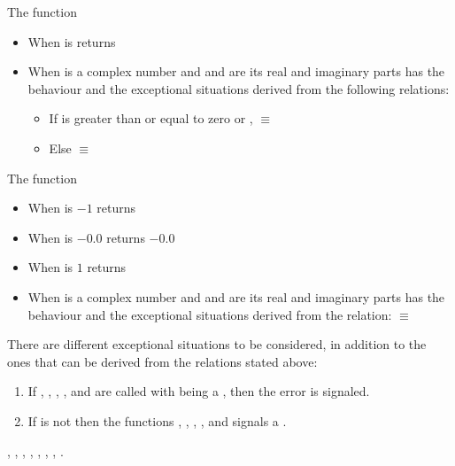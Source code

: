 \documentclass[../Exponentials-Logarithms-Trigonometry.tex]{subfiles}
\begin{document}
\noindent
The function 
\begin{itemize}
  \item When  is  returns
  \item When  is a complex number and   and 
  are its real and imaginary parts has the behaviour and the exceptional
  situations derived from the following relations:
  \begin{itemize}
    \item If  is greater than or equal to zero or
    , \code{)}
    $\equiv$ \code{
    }\code{)))}
    \item Else  \code{)}
    $\equiv$ \code{
    }\code{))))}
  \end{itemize}
\end{itemize}

\noindent
The function 
\begin{itemize}
  \item When  is $-1$ returns 
  \item When  is $-0.0$ returns $-0.0$
  \item When  is $1$ returns 
  \item When  is a complex number and   and 
  are its real and imaginary parts has the behaviour and the exceptional
  situations derived from the relation: \code{)}
  $\equiv$ \code{ (-
  }\code{)))}
\end{itemize}

\DExceptional{}

There are different exceptional situations to be considered, in addition to
the ones that can be derived from the relations stated above:
\begin{enumerate}
  \item If , , , ,
     and  are called with
     being a , then the
     error is signaled.
  \item If  is not \CL{}
     then the functions , , ,
    ,  and  signals a
    .
\end{enumerate}

\DSeeAlso{}

\code{*}, \code{-}, , , , ,
, .
\end{document}
